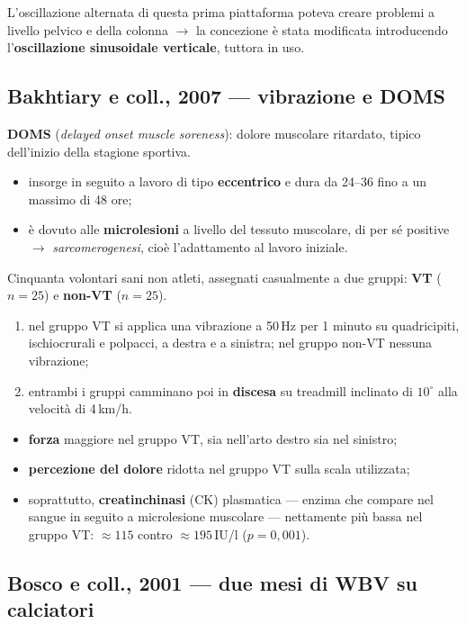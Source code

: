 L'oscillazione alternata di questa prima piattaforma poteva creare problemi a livello pelvico e
della colonna $\rightarrow$ la concezione è stata modificata introducendo l'\textbf{oscillazione
sinusoidale verticale}, tuttora in uso.

\subsection{Bakhtiary e coll., 2007 --- vibrazione e DOMS}

\textbf{DOMS} (\textit{delayed onset muscle soreness}): dolore muscolare ritardato, tipico
dell'inizio della stagione sportiva.
\begin{itemize}
  \item insorge in seguito a lavoro di tipo \textbf{eccentrico} e dura da 24--36 fino a un massimo
    di 48 ore;
  \item è dovuto alle \textbf{microlesioni} a livello del tessuto muscolare, di per sé positive
    $\rightarrow$ \textit{sarcomerogenesi}, cioè l'adattamento al lavoro iniziale.
\end{itemize}

Cinquanta volontari sani non atleti, assegnati casualmente a due gruppi: \textbf{VT} ($n=25$) e
\textbf{non-VT} ($n=25$).
\begin{enumerate}
  \item nel gruppo VT si applica una vibrazione a 50\,Hz per 1 minuto su quadricipiti, ischiocrurali
    e polpacci, a destra e a sinistra; nel gruppo non-VT nessuna vibrazione;
  \item entrambi i gruppi camminano poi in \textbf{discesa} su treadmill inclinato di $10^\circ$
    alla velocità di 4\,km/h.
\end{enumerate}

\begin{itemize}
  \item \textbf{forza} maggiore nel gruppo VT, sia nell'arto destro sia nel sinistro;
  \item \textbf{percezione del dolore} ridotta nel gruppo VT sulla scala utilizzata;
  \item soprattutto, \textbf{creatinchinasi} (CK) plasmatica --- enzima che compare nel sangue in
    seguito a microlesione muscolare --- nettamente più bassa nel gruppo VT: $\approx 115$ contro
    $\approx 195$\,IU/l ($p=0{,}001$).
\end{itemize}

\subsection{Bosco e coll., 2001 --- due mesi di WBV su calciatori}

